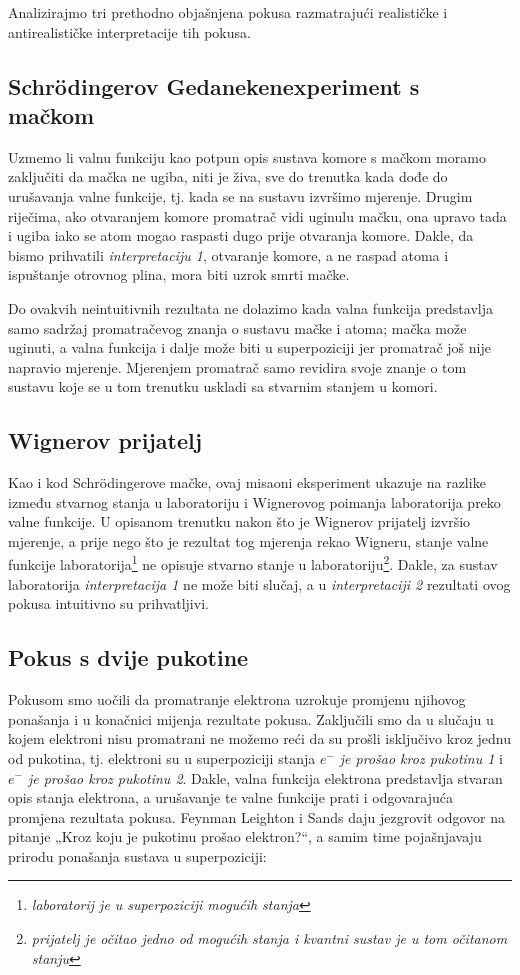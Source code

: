 \documentclass[twoside]{article}
\begin{document}
\noindent
Analizirajmo tri prethodno objašnjena pokusa razmatrajući realističke i antirealističke interpretacije tih pokusa.

\subsection{Schrödingerov Gedanekenexperiment s mačkom}
Uzmemo li valnu funkciju kao potpun opis sustava komore s mačkom moramo zaključiti da mačka ne ugiba, niti je živa, sve do trenutka kada dođe do urušavanja valne funkcije, tj. kada se na sustavu izvršimo mjerenje. Drugim riječima, ako otvaranjem komore promatrač vidi uginulu mačku, ona upravo tada i ugiba iako se atom mogao raspasti dugo prije otvaranja komore. Dakle, da bismo prihvatili \emph{interpretaciju 1}, otvaranje komore, a ne raspad atoma i ispuštanje otrovnog plina, mora biti uzrok smrti mačke. 

Do ovakvih neintuitivnih rezultata ne dolazimo kada valna funkcija predstavlja samo sadržaj promatračevog znanja o sustavu mačke i atoma; mačka može uginuti, a valna funkcija i dalje može biti u superpoziciji jer promatrač još nije napravio mjerenje. Mjerenjem promatrač samo revidira svoje znanje o tom sustavu koje se u tom trenutku uskladi sa stvarnim stanjem u komori.

\subsection{Wignerov prijatelj}
Kao i kod Schrödingerove mačke, ovaj misaoni eksperiment ukazuje na razlike između stvarnog stanja u laboratoriju i Wignerovog poimanja laboratorija preko valne funkcije. U opisanom trenutku nakon što je Wignerov prijatelj izvršio mjerenje, a prije nego što je rezultat tog mjerenja rekao Wigneru, stanje valne funkcije laboratorija\footnote{ \emph{laboratorij je u superpoziciji mogućih stanja}} ne opisuje stvarno stanje u laboratoriju\footnote{ \emph{prijatelj je očitao jedno od mogućih stanja i kvantni sustav je u tom očitanom stanju}}. Dakle, za sustav laboratorija \emph{interpretacija 1} ne može biti slučaj, a u \emph{interpretaciji 2} rezultati ovog pokusa intuitivno su prihvatljivi.

\subsection{Pokus s dvije pukotine}
Pokusom smo uočili da promatranje elektrona uzrokuje promjenu njihovog ponašanja i u konačnici mijenja rezultate pokusa. Zaključili smo da u slučaju u kojem elektroni nisu promatrani ne možemo reći da su prošli isključivo kroz jednu od pukotina, tj. elektroni su u superpoziciji stanja \emph{$e^-$ je prošao kroz pukotinu 1} i \emph{$e^-$ je prošao kroz pukotinu 2}. Dakle, valna funkcija elektrona predstavlja stvaran opis stanja elektrona, a urušavanje te valne funkcije prati i odgovarajuća promjena rezultata pokusa. Feynman Leighton i Sands daju jezgrovit odgovor na pitanje „Kroz koju je pukotinu prošao elektron?“, a samim time pojašnjavaju prirodu ponašanja sustava u superpoziciji: 
\end{document}
